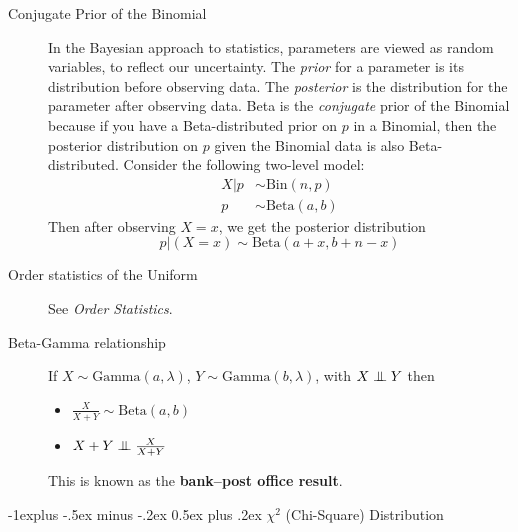 \documentclass[10pt,landscape]{article}
\makeatletter
\newcommand\independent{\protect\mathpalette{\protect\independenT}{\perp}}
\def\independenT#1#2{\mathrel{\setbox0\hbox{$#1#2$}%
    \copy0\kern-\wd0\mkern4mu\box0}}
\newcommand{\Bin}{\textrm{Bin}}
\newcommand{\Beta}{\textrm{Beta}}
\newcommand{\Gam}{\textrm{Gamma}}
\newcommand{\Expo}{\textrm{Expo}}
\renewcommand{\subsection}{\@startsection{subsection}{2}{0mm}%
                                {-1explus -.5ex minus -.2ex}%
                                {0.5ex plus .2ex}%
                                {\normalfont\normalsize\bfseries}}
\makeatother
\begin{document}
\begin{multicols*}{3}
\begin{description}

\item[Conjugate Prior of the Binomial] In the Bayesian approach to statistics, parameters are viewed as random variables, to reflect our uncertainty. The \emph{prior} for a parameter is its distribution before observing data. The \emph{posterior}  is the distribution for the parameter after observing data. Beta is the \emph{conjugate} prior of the Binomial because if you have a Beta-distributed prior on $p$ in a Binomial, then the posterior distribution on $p$ given the Binomial data is also Beta-distributed. Consider the following two-level model:
    \begin{align*}
        X|p &\sim \Bin(n, p) \\
        p &\sim \Beta(a, b)
    \end{align*}
Then after observing  $X = x$, we get the posterior distribution
\[p|(X=x) \sim \Beta(a + x, b + n - x) \]

\item[Order statistics of the Uniform] See \emph{Order Statistics}.
\item[Beta-Gamma relationship] If $X \sim \Gam(a, \lambda)$, $Y \sim \Gam(b, \lambda)$, with $X \independent Y$ then
    \begin{itemize}
    	\item $\frac{X}{X + Y} \sim \Beta(a, b)$
    	\item $X + Y \independent \frac{X}{X + Y}$
    \end{itemize}
    This is known as the \textbf{bank--post office result}.
\end{description}




\subsection{$\chi^2$ (Chi-Square) Distribution}


\end{multicols*}
\end{document}

